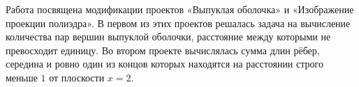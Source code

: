 Работа посвящена модификации проектов «Выпуклая оболочка» и
«Изображение проекции полиэдра». В первом из этих проектов решалась
задача на вычисление количества пар вершин выпуклой оболочки, расстояние между которыми не превосходит единицу. Во втором проекте вычислялась сумма длин рёбер, середина и ровно один из концов которых находятся на расстоянии строго меньше $1$ от плоскости $x=2$.
